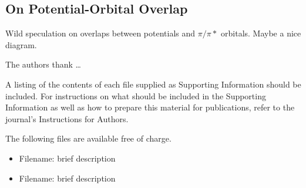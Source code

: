 \documentclass[journal=jctcce,manuscript=article]{achemso}
\begin{document}
\subsection{On Potential-Orbital Overlap}\label{section:po_overlap}

Wild speculation on overlaps between potentials and \(\pi / \pi*\) orbitals. Maybe a nice diagram.

\begin{acknowledgement}

The authors thank \ldots

\end{acknowledgement}

\begin{suppinfo}

A listing of the contents of each file supplied as Supporting Information
should be included. For instructions on what should be included in the
Supporting Information as well as how to prepare this material for
publications, refer to the journal's Instructions for Authors.

The following files are available free of charge.
\begin{itemize}
  \item Filename: brief description
  \item Filename: brief description
\end{itemize}

\end{suppinfo}


\end{document}
